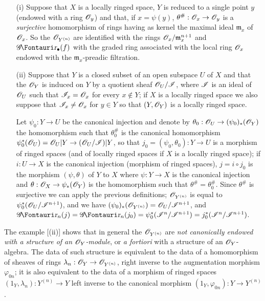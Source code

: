 \begin{examples}[16.1.3]
\label{IV.16.1.3}
\medskip\noindent
\begin{enumerate}
  \item[(i)] Suppose that $X$ is a locally ringed space, $Y$ is reduced to a single point $y$ (endowed with a ring $\mathscr{O}_y$) and that, if $x = \psi(y)$, $\theta^\#:\sh{O}_x \to \sh{O}_y$ is a \emph{surjective} homomorphism of rings having as kernel the maximal ideal $\mathfrak{m}_x$ of $\mathscr{O}_x$.
  So the $\mathscr{O}_{Y^{(n)}}$ are identified with the rings $\mathscr{O}_x/\mathfrak{m}_x^{n+1}$ and $\shGr_\bullet(f)$ with the graded ring associated with the local ring $\mathscr{O}_x$ endowed with the $\mathfrak{m}_x$-preadic filtration.
  \item[(ii)] Suppose that $Y$ is a closed subset of an open subspace $U$ of $X$ and that the $\mathscr{O}_Y$ is induced on $Y$ by a quotient sheaf $\mathscr{O}_U/\mathscr{I}$, where $\mathscr{I}$ is an ideal of $\mathscr{O}_U$ such that $\mathscr{I}_x = \mathscr{O}_x$ for every $x \not\in Y$;
  if $X$ is a locally ringed space we also suppose that $\mathscr{I}_x \neq \mathscr{O}_x$ for $y \in Y$ so that $(Y, \mathscr{O}_Y)$ is a locally ringed space.
  
  Let $\psi_0: Y \to U$ be the canonical injection and denote by $\theta_0: \sh{O}_U \to (\psi_0)_*(\sh{O}_Y)$ the homomorphism such that $\theta_0^\#$ is the canonical homomorphism $\psi^*_0(\sh{O}_U) = \sh{O}_U|Y \to (\sh{O}_U/\sh{I})|Y$, so that $j_0=(\psi_0, \theta_0):Y \to U$ is a morphism of ringed spaces (and of locally ringed spaces if $X$ is a locally ringed space);
  if $i:U \to X$ is the canonical injection (morphism of ringed spaces), $j = i\circ j_0$ is the morphism $(\psi, \theta)$ of $Y$ to $X$ where $\psi: Y \to X$ is the canonical injection and $\theta:\sh{O}_X \to \psi_*(\sh{O}_Y)$ is the homomorphism such that $\theta^\# = \theta_0^\#$.
  Since $\theta^\#$ is surjective we can apply the previous definitions;
  $\mathscr{O}_{Y^{(n)}}$ is equal to $\psi^*_0(\mathscr{O}_U/\mathscr{I}^{n+1})$, and we have $(\psi_0)_*(\mathscr{O}_{Y^{(n)}} ) = \mathscr{O}_U/\mathscr{I}^{n+1}$, and $\shGr_n(j) = \shGr_n(j_0) = \psi^*_0(\sh{I}^n/\sh{I}^{n+1}) = j^*_0(\sh{I}^n/\sh{I}^{n+1})$.
\end{enumerate}
\end{examples}

\begin{env}[16.1.4]
\label{IV.16.1.4}
The example [(ii)] shows that in general the $\mathscr{O}_{Y^{(n)}}$ are \emph{not canonically endowed with a structure of an $\mathscr{O}_Y$-module}, or \emph{a fortiori} with a structure of an $\mathscr{O}_Y$-algebra.
The data of such structure is equivalent to the data of a homomorphism of sheaves of rings $\lambda_n:\sh{O}_Y \to \sh{O}_{Y^{(n)}}$, right inverse to the augmentation morphism $\varphi_{0n}$;
it is also equivalent to the data of a morphism of ringed spaces $(1_Y, \lambda_n): Y^{(n)} \to Y$ left inverse to the canonical morphism $(1_Y, \varphi_{0n}): Y \to Y^{(n)}$.
\end{env}

